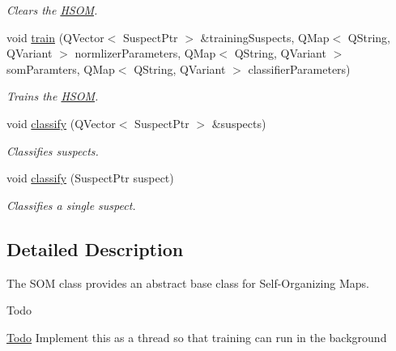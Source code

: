 \begin{DoxyCompactItemize}
\begin{DoxyCompactList}\small\item\em \-Clears the \hyperlink{classhsom_1_1_h_s_o_m}{\-H\-S\-O\-M}. \end{DoxyCompactList}\item 
void \hyperlink{classhsom_1_1_h_s_o_m_a1c7d16d551f08ee274fe8a9ebe5debda}{train} (\-Q\-Vector$<$ \-Suspect\-Ptr $>$ \&training\-Suspects, \-Q\-Map$<$ \-Q\-String, \-Q\-Variant $>$ normlizer\-Parameters, \-Q\-Map$<$ \-Q\-String, \-Q\-Variant $>$ som\-Paramters, \-Q\-Map$<$ \-Q\-String, \-Q\-Variant $>$ classifier\-Parameters)
\begin{DoxyCompactList}\small\item\em \-Trains the \hyperlink{classhsom_1_1_h_s_o_m}{\-H\-S\-O\-M}. \end{DoxyCompactList}\item 
void \hyperlink{classhsom_1_1_h_s_o_m_a5aca4d2c55beab117f090a6f2a43197c}{classify} (\-Q\-Vector$<$ \-Suspect\-Ptr $>$ \&suspects)
\begin{DoxyCompactList}\small\item\em \-Classifies suspects. \end{DoxyCompactList}\item 
void \hyperlink{classhsom_1_1_h_s_o_m_a9e5eebef993a09bb3e2702259fc1a140}{classify} (\-Suspect\-Ptr suspect)
\begin{DoxyCompactList}\small\item\em \-Classifies a single suspect. \end{DoxyCompactList}\end{DoxyCompactItemize}


\subsection{\-Detailed \-Description}
\-The \-S\-O\-M class provides an abstract base class for \-Self-\/\-Organizing \-Maps. 

\begin{DoxyRefDesc}{\-Todo}
\item[\hyperlink{todo__todo000013}{\-Todo}]\-Implement this as a thread so that training can run in the background \end{DoxyRefDesc}


